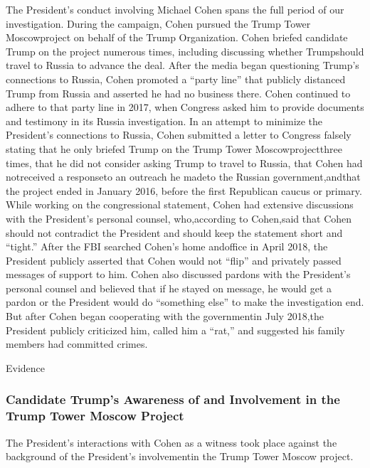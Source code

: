 The President’s conduct involving Michael Cohen spans the full period of our investigation. During the campaign, Cohen pursued the Trump Tower Moscowproject on behalf of the Trump Organization. Cohen briefed candidate Trump on the project numerous times, including discussing whether Trumpshould travel to Russia to advance the deal. After the media began questioning Trump’s connections to Russia, Cohen promoted a “party line” that publicly distanced Trump from Russia and asserted he had no business there. Cohen continued to adhere to that party line in 2017, when Congress asked him to provide documents and testimony in its Russia investigation. In an attempt to minimize the President’s connections to Russia, Cohen submitted a letter to Congress falsely stating that he only briefed Trump on the Trump Tower Moscowprojectthree times, that he did not consider asking Trump to travel to Russia, that Cohen had notreceived a responseto an outreach he madeto the Russian government,andthat the project ended in January 2016, before the first Republican caucus or primary. While working on the congressional statement, Cohen had extensive discussions with the President’s personal counsel, who,according to Cohen,said that Cohen should not contradict the President and should keep the statement short and “tight.” After the FBI searched Cohen’s home andoffice in April 2018, the President publicly asserted that Cohen would not “flip” and privately passed messages of support to him. Cohen also discussed pardons with the President’s personal counsel and believed that if he stayed on message, he would get a pardon or the President would do “something else” to make
the investigation end. But after Cohen began cooperating with the governmentin July 2018,the President publicly criticized him, called him a “rat,” and suggested his family members had committed crimes.

Evidence

\subsubsection{Candidate Trump’s Awareness of and Involvement in the Trump Tower Moscow Project}

The President’s interactions with Cohen as a witness took place against the background of the President’s involvementin the Trump Tower Moscow project.

